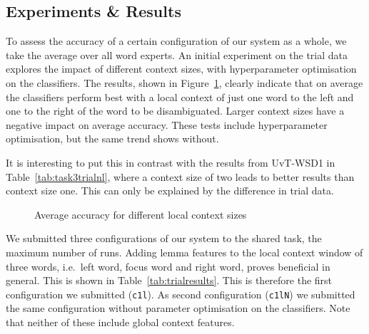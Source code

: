 \subsection{Experiments \& Results}

To assess the accuracy of a certain configuration of our system as a whole, we
take the average over all word experts. An initial experiment on the trial data
explores the impact of different context sizes, with hyperparameter
optimisation on the classifiers. The results, shown in Figure~\ref{figcontext},
clearly indicate that on average the classifiers perform best with a local
context of just one word to the left and one to the right of the word to be
disambiguated. Larger context sizes have a negative impact on average accuracy.
These tests include hyperparameter optimisation, but the same trend shows
without.

It is interesting to put this in contrast with the results from UvT-WSD1 in
Table~\ref{tab:task3trialnl}, where a context size of two leads to better
results than context size one.  This can only be explained by the
difference in trial data. %

\begin{figure}[t]
\noindent{}
\caption{Average accuracy for different local context sizes}
\label{figcontext}
\end{figure}

We submitted three configurations of our system to the shared task, the maximum
number of runs. Adding lemma features to the local context window of three
words, i.e.\ left word, focus word and right word, proves beneficial in general.
This is shown in Table~\ref{tab:trialresults}.  This is therefore the first
configuration we submitted (\texttt{c1l}). As second configuration
(\texttt{c1lN}) we submitted the same configuration without parameter
optimisation on the classifiers. Note that neither of these include global
context features.

